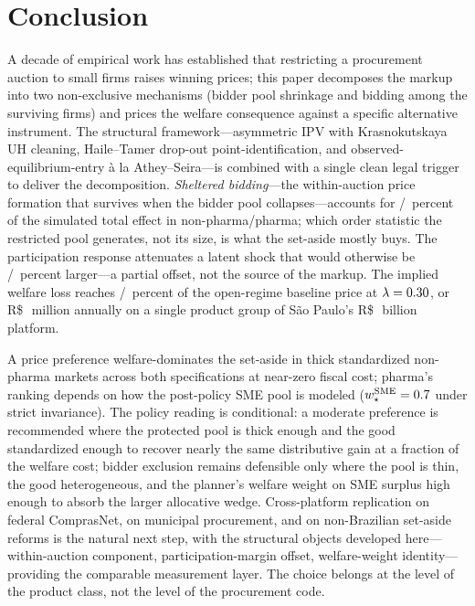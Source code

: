 \section{Conclusion}\label{sec:conclusion}

A decade of empirical work has established that restricting a procurement auction to small firms raises winning prices; this paper decomposes the markup into two non-exclusive mechanisms (bidder pool shrinkage and bidding among the surviving firms) and prices the welfare consequence against a specific alternative instrument. The structural framework---asymmetric IPV with Krasnokutskaya UH cleaning, Haile--Tamer drop-out point-identification, and observed-equilibrium-entry \`a la Athey--Seira---is combined with a single clean legal trigger to deliver the decomposition. \emph{Sheltered bidding}---the within-auction price formation that survives when the bidder pool collapses---accounts for \bneShareIntensNp/\bneShareIntensPh~percent of the simulated total effect in non-pharma/pharma; which order statistic the restricted pool generates, not its size, is what the set-aside mostly buys. The participation response attenuates a latent shock that would otherwise be \latentShockRatioNp/\latentShockRatioPh~percent larger---a partial offset, not the source of the markup. The implied welfare loss reaches \welfLossPctLthirtyNp/\welfLossPctLthirtyPh~percent of the open-regime baseline price at $\lambda = 0.30$, or R\$\,\welfAnnualBRLLo~million annually on a single product group of S\~ao Paulo's R\$\,\becAnnualVolBRL~billion platform.

A \optPrefThreshold{} price preference welfare-dominates the set-aside in thick standardized non-pharma markets across both specifications at near-zero fiscal cost; pharma's ranking depends on how the post-policy SME pool is modeled ($w^{\text{SME}}_\star = 0.7$ under strict invariance). The policy reading is conditional: a moderate preference is recommended where the protected pool is thick enough and the good standardized enough to recover nearly the same distributive gain at a fraction of the welfare cost; bidder exclusion remains defensible only where the pool is thin, the good heterogeneous, and the planner's welfare weight on SME surplus high enough to absorb the larger allocative wedge. Cross-platform replication on federal ComprasNet, on municipal procurement, and on non-Brazilian set-aside reforms is the natural next step, with the structural objects developed here---within-auction component, participation-margin offset, welfare-weight identity---providing the comparable measurement layer. The choice belongs at the level of the product class, not the level of the procurement code.

